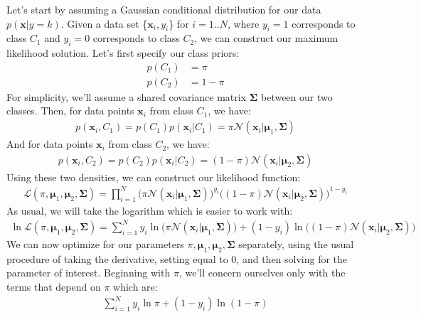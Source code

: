 Let's start by assuming a Gaussian conditional distribution for our data $p(\textbf{x} | y = k)$. Given a data set \{$\textbf{x}_{i}, y_{i}$\} for $i = 1..N$, where $y_{i} = 1$ corresponds to class $C_{1}$ and $y_{i} = 0$ corresponds to class $C_{2}$, we can construct our maximum likelihood solution. Let's first specify our class priors:
\begin{align*}
	p(C_{1}) &= \pi \\
	p(C_{2}) &= 1 - \pi
\end{align*}
For simplicity, we'll assume a shared covariance matrix $\boldsymbol{\Sigma}$ between our two classes. Then, for data points $\textbf{x}_{i}$ from class $C_{1}$, we have:
\begin{align*}
	p(\textbf{x}_{i}, C_{1}) = p(C_{1})p(\textbf{x}_{i}|C_{1}) = \pi\mathcal{N}(\textbf{x}_{i} | \boldsymbol{\mu}_{1}, \boldsymbol{\Sigma})
\end{align*}
And for data points $\textbf{x}_{i}$ from class $C_{2}$, we have:
\begin{align*}
	p(\textbf{x}_{i}, C_{2}) = p(C_{2})p(\textbf{x}_{i}|C_{2}) = (1-\pi)\mathcal{N}(\textbf{x}_{i} | \boldsymbol{\mu}_{2}, \boldsymbol{\Sigma})
\end{align*}
Using these two densities, we can construct our likelihood function:
\begin{align*}
	\mathcal{L}(\pi, \boldsymbol{\mu}_{1}, \boldsymbol{\mu}_{2}, \boldsymbol{\Sigma}) = \prod_{i=1}^{N} \bigg( \pi\mathcal{N}(\textbf{x}_{i} | \boldsymbol{\mu}_{1}, \boldsymbol{\Sigma}) \bigg)^{y_{i}} \bigg( (1-\pi)\mathcal{N}(\textbf{x}_{i} | \boldsymbol{\mu}_{2}, \boldsymbol{\Sigma}) \bigg)^{1 - y_{i}}
\end{align*}
As usual, we will take the logarithm which is easier to work with:
\begin{align*}
	\ln \mathcal{L}(\pi, \boldsymbol{\mu}_{1}, \boldsymbol{\mu}_{2}, \boldsymbol{\Sigma}) = \sum_{i=1}^{N} y_{i} \ln \bigg( \pi\mathcal{N}(\textbf{x}_{i} | \boldsymbol{\mu}_{1}, \boldsymbol{\Sigma}) \bigg) + (1 - y_{i}) \ln \bigg( (1-\pi)\mathcal{N}(\textbf{x}_{i} | \boldsymbol{\mu}_{2}, \boldsymbol{\Sigma}) \bigg)
\end{align*}
We can now optimize for our parameters $\pi, \boldsymbol{\mu}_{1}, \boldsymbol{\mu}_{2}, \boldsymbol{\Sigma}$ separately, using the usual procedure of taking the derivative, setting equal to 0, and then solving for the parameter of interest. Beginning with $\pi$, we'll concern ourselves only with the terms that depend on $\pi$ which are:
\begin{align*}
	\sum_{i=1}^{N} y_{i}\ln{\pi} + (1-y_{i})\ln{(1 - \pi)}
\end{align*}
